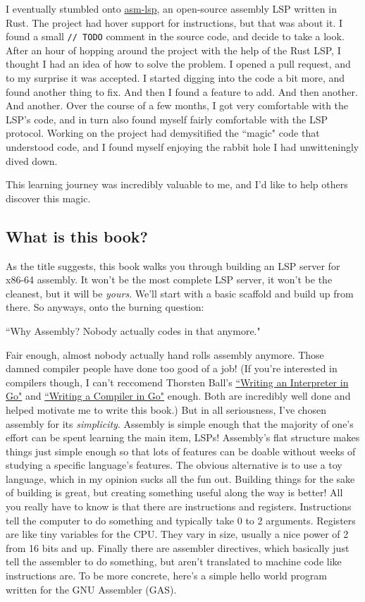 I eventually stumbled onto \href{https://github.com/bergercookie/asm-lsp}{asm-lsp},
an open-source assembly LSP written in Rust. The project had hover support for instructions,
but that was about it. I found a small \texttt{// TODO} comment in the source code,
and decide to take a look. After an hour of hopping around the project with the help
of the Rust LSP, I thought I had an idea of how to solve the problem. I opened a
pull request, and to my surprise it was accepted. I started digging into the code a bit more,
and found another thing to fix. And then I found a feature to add. And then another.
And another. Over the course of a few months, I got very comfortable with the LSP's
code, and in turn also found myself fairly comfortable with the LSP protocol. Working
on the project had demysitified the ``magic" code that understood code, and I found
myself enjoying the rabbit hole I had unwitteningly dived down.

This learning journey was incredibly valuable to me, and I'd like to help others 
discover this magic. 

\subsection{What is this book?}

As the title suggests, this book walks you through building an LSP server for x86-64
assembly. It won't be the most complete LSP server, it won't be the cleanest, but it
will be \textit{yours}. We'll start with a basic scaffold and build up from there.
So anyways, onto the burning question:

``Why Assembly? Nobody actually codes in that anymore." 

Fair enough, almost nobody actually hand rolls assembly anymore. Those damned compiler
people have done too good of a job! (If you're interested in compilers though, I 
can't reccomend Thorsten Ball's \href{https://interpreterbook.com}{``Writing an 
Interpreter in Go"} and \href{https://compilerbook.com}{``Writing a Compiler in 
Go"} enough. Both are incredibly well done and helped motivate me to write this 
book.) But in all seriousness, I've chosen assembly for its \textit{simplicity}.
Assembly is simple enough that the majority of one's effort can be spent learning
the main item, LSPs! Assembly's flat structure makes things just simple enough 
so that lots of features can be doable without weeks of studying a specific language's
features. The obvious alternative is to use a toy language, which in my opinion
sucks all the fun out. Building things for the sake of building is great, but creating
something useful along the way is better! All you really have to know is that there 
are instructions and registers. Instructions tell the computer to do something and
typically take 0 to 2 arguments. Registers are like tiny variables for the CPU.
They vary in size, usually a nice power of 2 from 16 bits and up. Finally there
are assembler directives, which basically just tell the assembler to do something,
but aren't translated to machine code like instructions are. To be more concrete,
here's a simple hello world program written for the GNU Assembler (GAS).

